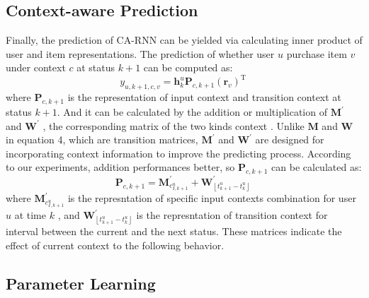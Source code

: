 \documentclass{sig-alternate}
\begin{document}
\subsection{Context-aware Prediction}

Finally, the prediction of CA-RNN can be yielded via calculating inner product of user and item representations. The prediction of whether user $u$ purchase item $v$  under context $c$ at status $k+1$ can be computed as:
\begin{equation}
y_{u, k+1, c, v} = \mathbf{h}_{k}^{u}\mathbf{P}_{c, k+1}(\mathbf{r}_{v})^ \mathrm{ T }~
\end{equation}
where $\mathbf{P}_{c, k+1}$ is the representation of input context and transition context at status $k+1$. And it can be calculated by the addition or multiplication of $\mathbf{M}^{'}$ and $\mathbf{W}^{'}$ , the corresponding matrix of the two kinds context . Unlike $\mathbf{M}$ and $\mathbf{W}$ in equation 4, which are transition matrices, $\mathbf{M}^{'}$ and $\mathbf{W}^{'}$ are designed for incorporating context information to improve the predicting process. According to our experiments, addition performances better, so $\mathbf{P}_{c, k+1}$ can be calculated as:
\begin{equation}   \label{eqPadd}
\mathbf{P}_{c, k+1}=\mathbf{M}_{c_{I,k+1}^{u}}^{'} + \mathbf{W}_{\left \lfloor t_{k+1}^{u} - t_{k}^{u}\right \rfloor}^{'}~
\end{equation}
where $\mathbf{M}_{c_{I,k+1}^{u}}^{'}$ is the represntation of specific input contexts combination for user $u$ at time $k$ , and $\mathbf{W}_{\left \lfloor t_{k+1}^{u} - t_{k}^{u}\right \rfloor}^{'}$ is the represntation of transition context for interval between the current and the next status. These matrices indicate the effect of current context to the following behavior.




\subsection{Parameter Learning}
\end{document}
